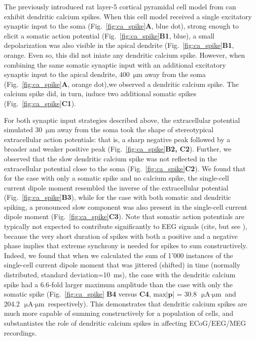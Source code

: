 \documentclass[preprint,10pt,authoryear]{elsarticle}
\newcommand{\hlb}[2][NavyBlue]{ {\sethlcolor{#1} \hl{#2}} }
\newcommand{\hlg}[2][Emerald]{ {\sethlcolor{#1} \hl{#2}} }
\newcommand{\snnote}[1]{\color{white}{\hlb{SN: #1 }}\color{black}}
\newcommand{\tvnnote}[1]{\color{white}{\hlg{TVN: #1 }}\color{black}}
\begin{document}
The previously introduced rat layer-5 cortical pyramidal cell model from \cite{HAY2011} can exhibit dendritic calcium spikes.
When this cell model received a single excitatory synaptic input to the soma (Fig.~\ref{fig:ca_spike}\textbf{A}, blue dot), strong enough to elicit a somatic action potential (Fig.~\ref{fig:ca_spike}\textbf{B1}, blue), a small depolarization was also visible in the apical dendrite (Fig.~\ref{fig:ca_spike}\textbf{B1}, orange. Even so, this did not iniate any dendritic calcium spike. However, when combining the same somatic synaptic input with an additional excitatory synaptic input to the apical dendrite, 400~$\si{\um}$ away from the soma (Fig.~\ref{fig:ca_spike}\textbf{A}, orange dot),we observed a dendritic calcium spike. The calcium spike did, in turn, induce two additional somatic spikes (Fig.~\ref{fig:ca_spike}\textbf{C1}).

For both synaptic input strategies described above, the extracellular potential simulated 30~$\si{\um}$ away from the soma took the shape of stereotypical extracellular action potentials: that is, a sharp negative peak followed by a broader and weaker positive peak (Fig.~\ref{fig:ca_spike}\textbf{B2, C2}). Further, we observed that the slow dendritic calcium spike was not reflected in the extracellular potential close to the soma (Fig.~\ref{fig:ca_spike}\textbf{C2}).
We found that for the case with only a somatic spike and no calcium spike, the single-cell current dipole moment resembled the inverse of the extracellular potential (Fig.~\ref{fig:ca_spike}\textbf{B3}), while for the case with both somatic and dendritic spiking, a pronounced slow component was also present in the single-cell current dipole moment (Fig.~\ref{fig:ca_spike}\textbf{C3}).
Note that somatic action potentials are typically not expected to contribute significantly to EEG signals (cite, but see \cite{TELENCZUK2015}), because the very short duration of spikes with both a positive and a negative phase implies that extreme synchrony is needed for spikes to sum constructively. Indeed, we found that when we calculated the sum of 1'000 instances of the single-cell current dipole moment that was jittered (shifted) in time (normally distributed, standard deviation=10~ms), the case with the dendritic calcium spike had a $6.6$-fold larger maximum amplitude than the case with
only the somatic spike (Fig.~\ref{fig:ca_spike} \textbf{B4} versus \textbf{C4}, 
$\mathrm{max}|\mathbf{p}$| = 30.8~$\si{\uA}\cdot\si{\um}$ and 204.2~$\si{\uA}\cdot\si{\um}$ respectively).
This demonstrates that dendritic calcium spikes are much more capable of summing constructively for a population of cells, and substantiates the role of dendritic calcium spikes in affecting ECoG/EEG/MEG recordings. 
\end{document}
